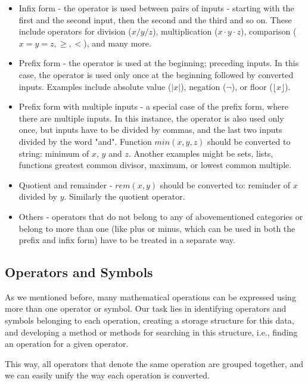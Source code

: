 \documentclass[11pt,oneside,final]{fithesis2}
\begin{document}
\begin{itemize}
\item Infix form - the operator is used between pairs of inputs - starting with the first and the second input, then the second and the third and so on. These include operators for division ($x/y/z$), multiplication ($x\cdot y\cdot z$), comparison ($x=y=z, \geq, <$), and many more.

\item  Prefix form - the operator is used at the beginning; preceding inputs. In this case, the operator is used only once at the beginning followed by converted inputs. Examples include absolute value ($|x|$), negation ($\neg$), or floor ($\lfloor x \rfloor$).

\item Prefix form with multiple inputs - a special case of the prefix form, where there are multiple inputs. In this instance, the operator is also used only once, but inputs have to be divided by commas, and the last two inputs divided by the word "and". Function $min(x,y,z)$ should be converted to string: minimum of $x$, $y$ and $z$. Another examples might be sets, lists, functions greatest common divisor, maximum, or lowest common multiple.

\item Quotient and remainder - $rem(x,y)$ should be converted to: reminder of $x$ divided by $y$. Similarly the quotient operator.

\item Others - operators that do not belong to any of abovementioned categories or belong to more than one (like plus or minus, which can be used in both the prefix and infix form) have to be treated in a separate way.
\end{itemize}

\subsection{Operators and Symbols}
As we mentioned before, many mathematical operations can be expressed using more than one operator or symbol. Our task lies in identifying operators and symbols belonging to each operation, creating a storage structure for this data, and developing a method or methods for searching in this structure, i.e., finding an operation for a given operator. 

This way, all operators that denote the same operation are grouped together, and we can easily unify the way each operation is converted.
\end{document}
